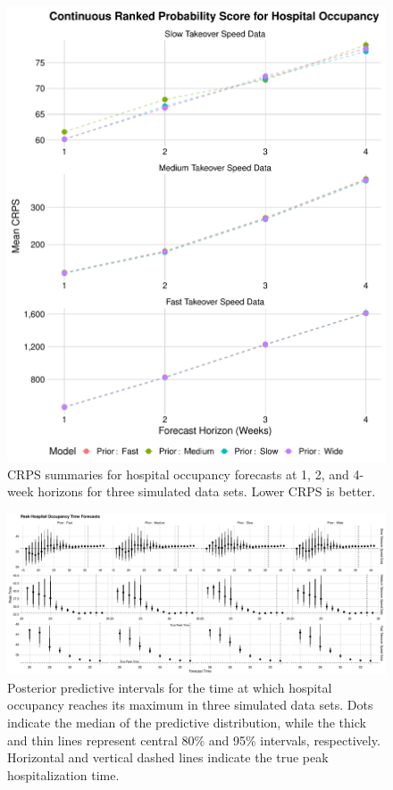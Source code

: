 \begin{figure}
    \centering
    \includegraphics[width=0.75\columnwidth]{sensitivity_simulated_crps_comparison_dotplot_data_hospitalizations_plot}
    \caption[CRPS summaries for hospital occupancy forecasts for simulated data sets.]{CRPS summaries for hospital occupancy forecasts at 1, 2, and 4-week horizons for three simulated data sets. Lower CRPS is better.}
    \label{ch_5:fig:sensitivity_simulated_crps_comparison_dotplot_data_hospitalizations_plot}
\end{figure}


\begin{figure}
    \centering
    \includegraphics[width=1.0\columnwidth]{sensitivity_simulated_peak_assessment_time_plot}
    \caption[Posterior predictive intervals for peak hospital occupancy timing for simulated data sets.]{Posterior predictive intervals for the time at which hospital occupancy reaches its maximum in three simulated data sets.
    Dots indicate the median of the predictive distribution, while the thick and thin lines represent central 80\% and 95\% intervals, respectively.
    Horizontal and vertical dashed lines indicate the true peak hospitalization time.}
    \label{ch_5:fig:sensitivity_simulated_peak_assessment_time_plot}
\end{figure}

